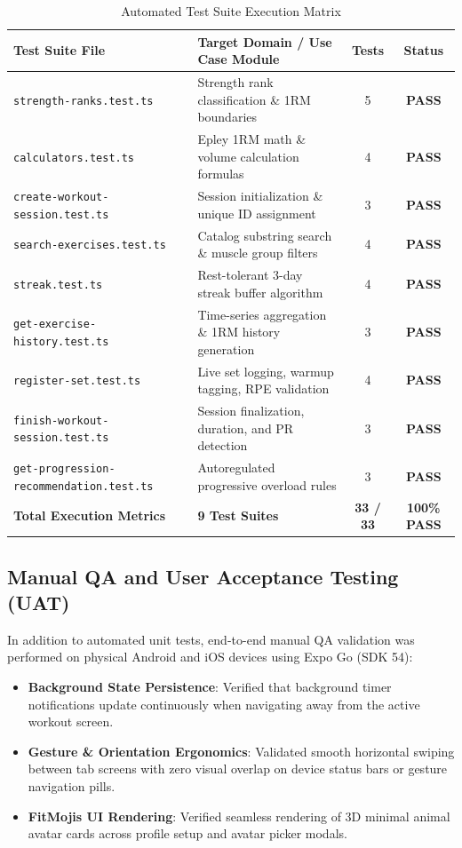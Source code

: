 \begin{table}[h!]
\centering
\small
\caption{Automated Test Suite Execution Matrix}
\label{tab:test_suite_results}
\begin{tabularx}{\textwidth}{l p{5.5cm} c c}
\toprule
\textbf{Test Suite File} & \textbf{Target Domain / Use Case Module} & \textbf{Tests} & \textbf{Status} \\
\midrule
\texttt{strength-ranks.test.ts} & Strength rank classification \& 1RM boundaries & 5 & \textbf{PASS} \\
\texttt{calculators.test.ts} & Epley 1RM math \& volume calculation formulas & 4 & \textbf{PASS} \\
\texttt{create-workout-session.test.ts} & Session initialization \& unique ID assignment & 3 & \textbf{PASS} \\
\texttt{search-exercises.test.ts} & Catalog substring search \& muscle group filters & 4 & \textbf{PASS} \\
\texttt{streak.test.ts} & Rest-tolerant 3-day streak buffer algorithm & 4 & \textbf{PASS} \\
\texttt{get-exercise-history.test.ts} & Time-series aggregation \& 1RM history generation & 3 & \textbf{PASS} \\
\texttt{register-set.test.ts} & Live set logging, warmup tagging, RPE validation & 4 & \textbf{PASS} \\
\texttt{finish-workout-session.test.ts} & Session finalization, duration, and PR detection & 3 & \textbf{PASS} \\
\texttt{get-progression-recommendation.test.ts} & Autoregulated progressive overload rules & 3 & \textbf{PASS} \\
\midrule
\textbf{Total Execution Metrics} & \textbf{9 Test Suites} & \textbf{33 / 33} & \textbf{100\% PASS} \\
\bottomrule
\end{tabularx}
\end{table}

\subsection{Manual QA and User Acceptance Testing (UAT)}
In addition to automated unit tests, end-to-end manual QA validation was performed on physical Android and iOS devices using Expo Go (SDK 54):
\begin{itemize}
    \item \textbf{Background State Persistence}: Verified that background timer notifications update continuously when navigating away from the active workout screen.
    \item \textbf{Gesture \& Orientation Ergonomics}: Validated smooth horizontal swiping between tab screens with zero visual overlap on device status bars or gesture navigation pills.
    \item \textbf{FitMojis UI Rendering}: Verified seamless rendering of 3D minimal animal avatar cards across profile setup and avatar picker modals.
\end{itemize}
